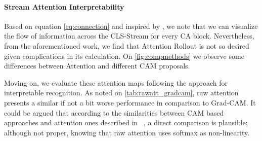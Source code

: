     \paragraph{Stream Attention Interpretability}
    Based on equation \ref{eq:connection} and inspired by \cite{abnar2020quantifying}, we note that we can visualize the flow of information across the CLS-Stream for every CA block. Nevertheless, from the aforementioned work, we find that Attention Rollout is not so desired given complications in its calculation. On \autoref{fig:compmethods} we observe some differences between Attention and different CAM proposals. %


    Moving on, we evaluate these attention maps following the approach for interpretable recognition. As noted on \autoref{tab:rawatt_gradcam}, raw attention presents a similar if not a bit worse performance in comparison to Grad-CAM. It could be argued that according to the similarities between CAM based approaches and attention ones described in ~, a direct comparison is plausible; although not proper, knowing that raw attention uses softmax as non-linearity.

